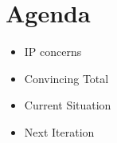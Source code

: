 \documentclass{article}
\begin{document}
\section{Agenda}
\begin{itemize}
	\item IP concerns
	\item Convincing Total
	\item Current Situation
	\item Next Iteration
\end{itemize}
\end{document}
